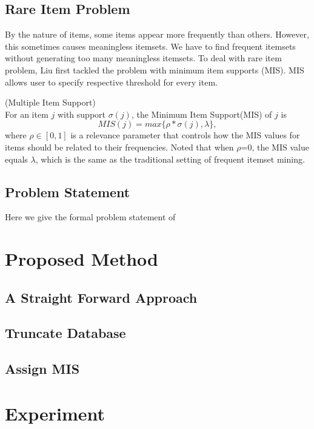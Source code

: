 \documentclass[conference]{IEEEtran}
\begin{document}
\subsection{Rare Item Problem}
By the nature of items, some items appear more frequently than others. However, this sometimes causes meaningless itemsets.
We have to find frequent itemsets without generating too many meaningless itemsets.
To deal with rare item problem, Liu\cite{b2} first tackled the problem with minimum item supports (MIS).
MIS allows user to specify respective threshold for every item.
\begin{definition}{(Multiple Item Support)}\\%
For an item $j$ with support $\sigma(j)$, the Minimum Item Support(MIS) of $j$ is
\begin{equation} 
MIS(j)=max\{\rho*\sigma(j),\lambda\},\label{eq}
\end{equation}
where $\rho\in[0,1]$ is a relevance parameter that controls how the MIS values for items should be related to their frequencies.
Noted that when $\rho$=0, the MIS value equals $\lambda$, which is the same as the traditional setting of frequent itemset mining.
\end{definition}



\subsection{Problem Statement}
Here we give the formal problem statement of



\section{Proposed Method}
\subsection{A Straight Forward Approach}

\subsection{Truncate Database}
\subsection{Assign MIS}




\section{Experiment}
\end{document}
